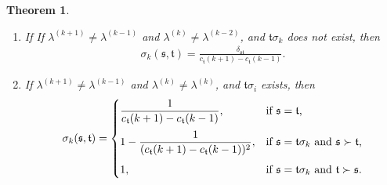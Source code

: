 \documentclass[11pt,a4paper,reqno,svgnames]{amsart}
\theoremstyle{plain}
\newtheorem{theorem}{Theorem}[section]
\theoremstyle{definition}
\numberwithin{equation}{section}
\begin{document}
\begin{theorem}
\begin{enumerate}[label=(\arabic{*}), ref=\arabic{*},leftmargin=0pt,itemindent=1.5em]
\begin{align}
\end{align}
\item\label{sigmaeven.4} If If $\lambda^{(k+1)}\ne\lambda^{(k-1)}$ and $\lambda^{(k)}\ne\lambda^{(k-2)}$, and $\mathfrak{t}\sigma_{k}$ does not exist, then 
\begin{align}\label{sigmaeven.4.1}
\sigma_{k}(\mathfrak{s},\mathfrak{t})=
\frac{\delta_\mathfrak{st}}{c_\mathfrak{t}(k+1)-c_\mathfrak{t}(k-1)}.
\end{align}
\item\label{sigmaeven.5} If $\lambda^{(k+1)}\ne\lambda^{(k-1)}$ and $\lambda^{(k)}\ne\lambda^{(k)}$, and $\mathfrak{t}\sigma_{i}$ exists, then 
\begin{align}\label{sigmaeven.5.1}
\sigma_{k}(\mathfrak{s},\mathfrak{t})=
\begin{cases}
{\displaystyle\frac{1}{c_\mathfrak{t}(k+1)-c_\mathfrak{t}(k-1)},}&
\text{if $\mathfrak{s}=\mathfrak{t}$,}\medskip\\1-{\displaystyle\frac{1}{(c_\mathfrak{t}(k+1)-c_\mathfrak{t}(k-1))^2}},
&\text{if $\mathfrak{s}=\mathfrak{t}\sigma_{k}$ and $\mathfrak{s}\succ\mathfrak{t}$,}\medskip\\
1, &\text{if $\mathfrak{s}=\mathfrak{t}\sigma_{k}$ and $\mathfrak{t}\succ\mathfrak{s}$.}
\end{cases}
\end{align}
\end{enumerate}
\end{theorem}
\end{document}
